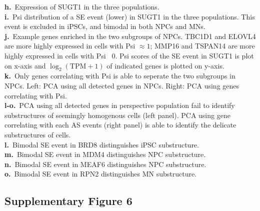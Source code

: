 \begin{minipage}{\textwidth}
{\textbf{h.}~Expression of SUGT1 in the three populations.\\
\textbf{i.}~Psi distribution of a SE event (lower) in SUGT1 in the three populations. This event is excluded in iPSCs, and bimodal in both NPCs and MNs.\\
\textbf{j.}~Example genes enriched in the two subgroups of NPCs. TBC1D1 and ELOVL4 are more highly expressed in cells with Psi $\approx 1$; MMP16 and TSPAN14 are more highly expressed in cells with Psi ~0. Psi scores of the SE event in SUGT1 is plot on x-axis and $\log_2(\mathrm{TPM}+1)$ of indicated genes is plotted on y-axis.\\
\textbf{k.}~Only genes correlating with Psi is able to seperate the two subgroups in NPCs. Left: PCA using all detected genes in NPCs. Right: PCA using genes correlating with Psi.\\
\textbf{l-o.}~PCA using all detected genes in perspective population fail to identify substructures of seemingly homogenous cells (left panel). PCA using gene correlating with each AS events (right panel) is able to identify the delicate substructures of cells.\\
\textbf{l.}~Bimodal SE event in BRD8 distinguishes iPSC substructure.\\
\textbf{m.}~Bimodal SE event in MDM4 distinguishes NPC substructure.\\
\textbf{n.}~Bimodal SE event in MEAF6 distinguishes NPC substructure.\\
\textbf{o.}~Bimodal SE event in RPN2 distinguishes MN substructure.\\
}
\end{minipage}



\subsection{Supplementary Figure 6}

